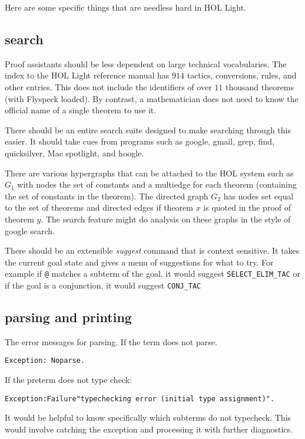 

Here are some specific things that are needless hard in HOL Light.

\subsection{search}

Proof assistants should be less dependent on large technical
vocabularies.  The index to the HOL Light reference manual has $914$
tactics, conversions, rules, and other entries.  This does not include 
the identifiers of over
$11$ thousand theorems (with Flyspeck loaded).  
By contrast, a mathematician does not need to
know the official name of a single theorem to use it.  

There should be an entire search suite designed to make searching
through this easier.  It should take cues from programs such as
google, gmail, grep, find, quicksilver, Mac spotlight, and hoogle.

There are various hypergraphs that can be attached to the HOL system such
as $G_1$ with nodes the set of constants and a multiedge for each theorem
(containing the set of constants in the theorem).  The directed graph $G_2$
has nodes set equal to the set of theorems and directed edges if theorem $x$
is quoted in the proof of theorem $y$.  The search feature might do analysis
on these graphs in the style of google search.

There should be an extensible {\it suggest} command that is
context sensitive.  It takes the
current goal state and gives a menu of suggestions for what to try.  For example if
\verb!@! matches a subterm of the goal, it would suggest \verb!SELECT_ELIM_TAC!
or if the goal is a conjunction, it would suggest \verb!CONJ_TAC!

\subsection{parsing and printing}

The error messages for parsing.  If the term does not parse.
\begin{verbatim}
Exception: Noparse.
\end{verbatim}

If the preterm does not type check:
\begin{verbatim}
Exception:Failure"typechecking error (initial type assignment)".
\end{verbatim}

It would be helpful to know specifically which subterms do not typecheck.
This would involve catching the exception and processing it with further
diagnostics.

